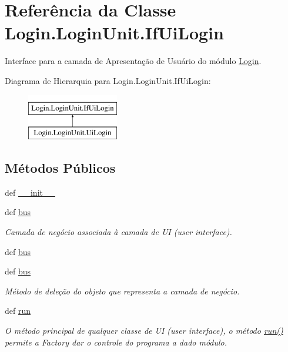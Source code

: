 \hypertarget{classLogin_1_1LoginUnit_1_1IfUiLogin}{\section{Referência da Classe Login.\-Login\-Unit.\-If\-Ui\-Login}
\label{classLogin_1_1LoginUnit_1_1IfUiLogin}
}


Interface para a camada de Apresentação de Usuário do módulo \hyperlink{namespaceLogin}{Login}.  


Diagrama de Hierarquia para Login.\-Login\-Unit.\-If\-Ui\-Login\-:\begin{figure}[H]
\begin{center}
\leavevmode
\includegraphics[height=2.000000cm]{d9/d56/classLogin_1_1LoginUnit_1_1IfUiLogin}
\end{center}
\end{figure}
\subsection*{Métodos Públicos}
\begin{DoxyCompactItemize}
\item 
def \hyperlink{classLogin_1_1LoginUnit_1_1IfUiLogin_a2afcef7056181566ac0e801ad8094ece}{\-\_\-\-\_\-init\-\_\-\-\_\-}
\item 
def \hyperlink{classLogin_1_1LoginUnit_1_1IfUiLogin_abab63bd2085f485ca82494db8eb5f520}{bus}
\begin{DoxyCompactList}\small\item\em Camada de negócio associada à camada de U\-I (user interface). \end{DoxyCompactList}\item 
def \hyperlink{classLogin_1_1LoginUnit_1_1IfUiLogin_abab63bd2085f485ca82494db8eb5f520}{bus}
\item 
def \hyperlink{classLogin_1_1LoginUnit_1_1IfUiLogin_abab63bd2085f485ca82494db8eb5f520}{bus}
\begin{DoxyCompactList}\small\item\em Método de deleção do objeto que representa a camada de negócio. \end{DoxyCompactList}\item 
def \hyperlink{classLogin_1_1LoginUnit_1_1IfUiLogin_ac6250c19afa63158907c6e8b4ff6dbd5}{run}
\begin{DoxyCompactList}\small\item\em O método principal de qualquer classe de U\-I (user interface), o método \hyperlink{classLogin_1_1LoginUnit_1_1IfUiLogin_ac6250c19afa63158907c6e8b4ff6dbd5}{run()} permite a Factory dar o controle do programa a dado módulo. \end{DoxyCompactList}\end{DoxyCompactItemize}

